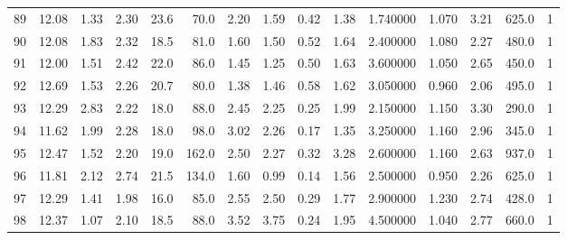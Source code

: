 \documentclass{article}
\begin{document}
\begin{tabular}{lrrrrrrrrrrrrrr}
    89  &    12.08 &        1.33 &  2.30 &               23.6 &       70.0 &           2.20 &        1.59 &                  0.42 &             1.38 &         1.740000 &  1.070 &                          3.21 &    625.0 &      1 \\
    90  &    12.08 &        1.83 &  2.32 &               18.5 &       81.0 &           1.60 &        1.50 &                  0.52 &             1.64 &         2.400000 &  1.080 &                          2.27 &    480.0 &      1 \\
    91  &    12.00 &        1.51 &  2.42 &               22.0 &       86.0 &           1.45 &        1.25 &                  0.50 &             1.63 &         3.600000 &  1.050 &                          2.65 &    450.0 &      1 \\
    92  &    12.69 &        1.53 &  2.26 &               20.7 &       80.0 &           1.38 &        1.46 &                  0.58 &             1.62 &         3.050000 &  0.960 &                          2.06 &    495.0 &      1 \\
    93  &    12.29 &        2.83 &  2.22 &               18.0 &       88.0 &           2.45 &        2.25 &                  0.25 &             1.99 &         2.150000 &  1.150 &                          3.30 &    290.0 &      1 \\
    94  &    11.62 &        1.99 &  2.28 &               18.0 &       98.0 &           3.02 &        2.26 &                  0.17 &             1.35 &         3.250000 &  1.160 &                          2.96 &    345.0 &      1 \\
    95  &    12.47 &        1.52 &  2.20 &               19.0 &      162.0 &           2.50 &        2.27 &                  0.32 &             3.28 &         2.600000 &  1.160 &                          2.63 &    937.0 &      1 \\
    96  &    11.81 &        2.12 &  2.74 &               21.5 &      134.0 &           1.60 &        0.99 &                  0.14 &             1.56 &         2.500000 &  0.950 &                          2.26 &    625.0 &      1 \\
    97  &    12.29 &        1.41 &  1.98 &               16.0 &       85.0 &           2.55 &        2.50 &                  0.29 &             1.77 &         2.900000 &  1.230 &                          2.74 &    428.0 &      1 \\
    98  &    12.37 &        1.07 &  2.10 &               18.5 &       88.0 &           3.52 &        3.75 &                  0.24 &             1.95 &         4.500000 &  1.040 &                          2.77 &    660.0 &      1 \\

\end{tabular}
\end{document}
